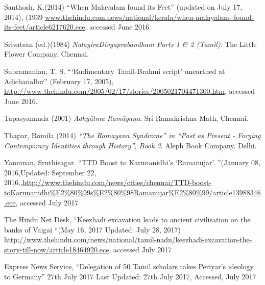 \begin{thebibliography}{99}
  Santhosh, K.(2014) “When Malayalam found its Feet” (updated on July 17, 2014), (1939 \url{www.thehindu.com.news/national/kerala/when-malayalam--found-its-feet/article6217620.ece}, accessed June 2016.

  Srivatsan (ed.)(1984) \textit{NalayiraDivyaprabandham Parts 1 \& 2 (Tamil)}. The Little Flower Company. Chennai.

  Subramanian, T. S. “‘Rudimentary Tamil-Brahmi script' unearthed at Adichanallur” (February 17, 2005), \url{http://www.thehindu.com/2005/02/17/stories/2005021704471300.htm}, accessed June 2016.

  Tapasyananda (2001) \textit{Adhyātma Ramāyaņa}. Sri Ramakrishna Math, Chennai.

  Thapar, Romila (2014) \textit{“The Ramayana Syndrome” in “Past as Present - Forging} \textit{Contemporary Identities through History”, Book 3}. Aleph Book Company. Delhi.

  Yamunan, Sruthisagar. “TTD Boost to Karunanidhi’s ‘Ramanujar’. ”(January 08, 2016,Updated: September 22, 2016,\url{,http://www.thehindu.com/news/cities/chennai/TTD-boost-toKarunanidhi%E2%80%99s%E2%80%98Ramanujar%E2%80%99/article13988346.ece}, accessed July 2017

  The Hindu Net Desk, “Keezhadi excavation leads to ancient civilisation on the banks of Vaigai “(May 16, 2017 Updated: July 28, 2017) \url{http://www.thehindu.com/news/national/tamil-nadu/keezhadi-excavation-the-story-till-now/article18464920.ece}, accessed July 2017

  Express News Service, “Delegation of 50 Tamil scholars takes Periyar’s ideology to Germany” 27th July 2017 Last Updated: 27th July 2017, Accessed, July 2017

 \end{thebibliography}

